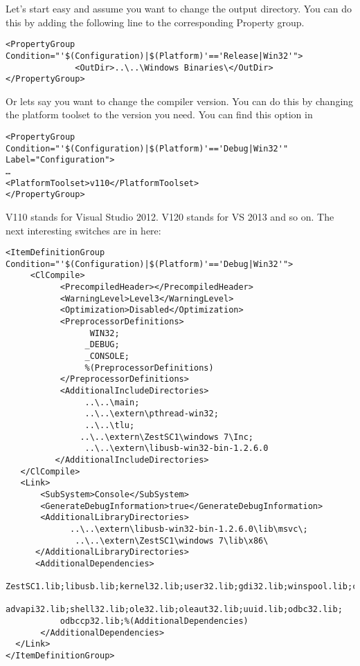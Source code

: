 Let’s start easy and assume you want to change the output directory. You can do this by adding the following line to the corresponding Property group. 

\lstset{language=XML}
\begin{lstlisting}
<PropertyGroup Condition="'$(Configuration)|$(Platform)'=='Release|Win32'">   
              <OutDir>..\..\Windows Binaries\</OutDir>
</PropertyGroup>

\end{lstlisting}

Or lets say you want to change the compiler version. You can do this by changing the platform toolset to the version you need. You can find this option in 
\lstset{language=XML}
\begin{lstlisting}
<PropertyGroup Condition="'$(Configuration)|$(Platform)'=='Debug|Win32'" Label="Configuration">
…
<PlatformToolset>v110</PlatformToolset>
</PropertyGroup>
\end{lstlisting}

V110 stands for Visual Studio 2012. V120 stands for VS 2013 and so on.
The next interesting switches are in here:

\lstset{language=XML}
\begin{lstlisting}
<ItemDefinitionGroup Condition="'$(Configuration)|$(Platform)'=='Debug|Win32'">
     <ClCompile>
           <PrecompiledHeader></PrecompiledHeader>
           <WarningLevel>Level3</WarningLevel>
           <Optimization>Disabled</Optimization>
           <PreprocessorDefinitions>
                 WIN32;
                _DEBUG;
                _CONSOLE;
                %(PreprocessorDefinitions)
           </PreprocessorDefinitions>
           <AdditionalIncludeDirectories>
                ..\..\main;
                ..\..\extern\pthread-win32;
                ..\..\tlu;
               ..\..\extern\ZestSC1\windows 7\Inc;
                ..\..\extern\libusb-win32-bin-1.2.6.0
          </AdditionalIncludeDirectories>
   </ClCompile>
   <Link>
       <SubSystem>Console</SubSystem>
       <GenerateDebugInformation>true</GenerateDebugInformation>
       <AdditionalLibraryDirectories>
             ..\..\extern\libusb-win32-bin-1.2.6.0\lib\msvc\;
              ..\..\extern\ZestSC1\windows 7\lib\x86\
      </AdditionalLibraryDirectories>
      <AdditionalDependencies>
           ZestSC1.lib;libusb.lib;kernel32.lib;user32.lib;gdi32.lib;winspool.lib;comdlg32.lib;
           advapi32.lib;shell32.lib;ole32.lib;oleaut32.lib;uuid.lib;odbc32.lib;
           odbccp32.lib;%(AdditionalDependencies)
       </AdditionalDependencies>
  </Link> 
</ItemDefinitionGroup>
\end{lstlisting}

